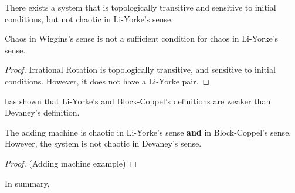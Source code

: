 \documentclass[12pt,twoside,draft]{book}
\begin{document}
There exists a system that is topologically transitive and sensitive to initial conditions, but not chaotic in Li-Yorke's sense.
\begin{theorem}
  \citep{blanchard}
  Chaos in Wiggins's sense is not a sufficient condition for chaos in Li-Yorke's sense.  
  \begin{proof}
    Irrational Rotation is topologically transitive, and sensitive to initial conditions.
    However, it does not have a Li-Yorke pair. 
  \end{proof}
\end{theorem}

\citet{aulbach} has shown that Li-Yorke's and Block-Coppel's definitions are weaker than Devaney's definition.
\begin{theorem}
  \citep{aulbach} 
  The adding machine is chaotic in Li-Yorke's sense \textbf{and} in Block-Coppel's sense.
  However, the system is not chaotic in Devaney's sense.
  \begin{proof}
    (Adding machine example)
  \end{proof}
\end{theorem}

In summary,




\printindex
\end{document}
